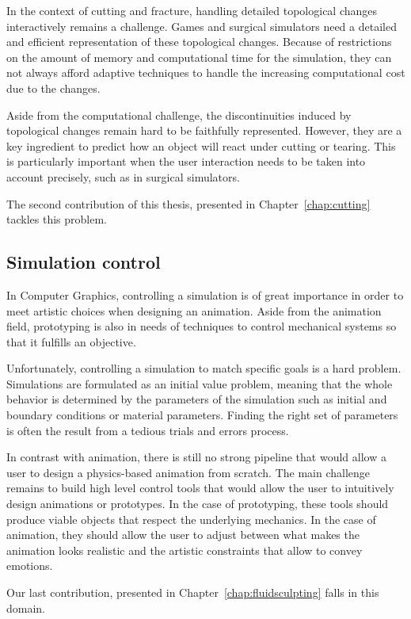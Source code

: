 In the context of cutting and fracture, handling detailed topological changes interactively remains a challenge. Games and surgical simulators need a detailed and efficient representation of these topological changes. Because of restrictions on the amount of memory and computational time for the simulation, they can not always afford adaptive techniques to handle the increasing computational cost due to the changes.

Aside from the computational challenge, the discontinuities induced by topological changes remain hard to be faithfully represented. However, they are a key ingredient to predict how an object will react under cutting or tearing.
This is particularly important when the user interaction needs to be taken into account precisely, such as in surgical simulators.

The second contribution of this thesis, presented in Chapter~\ref{chap:cutting} tackles this problem.

\subsection{Simulation control}

In Computer Graphics, controlling a simulation is of great importance in order to meet artistic choices when designing an animation. Aside from the animation field, prototyping is also in needs of techniques to control mechanical systems so that it fulfills an objective.

Unfortunately, controlling a simulation to match specific goals is a hard problem. 
Simulations are formulated as an initial value problem, meaning that the whole behavior is determined by the parameters of the simulation such as initial and boundary conditions or material parameters. 
Finding the right set of parameters is often the result from a tedious trials and errors process.

In contrast with animation, there is still no strong pipeline that would allow a user to design a physics-based animation from scratch. 
The main challenge remains to build high level control tools that would allow the user to intuitively design animations or prototypes. 
In the case of prototyping, these tools should produce viable objects that respect the underlying mechanics. 
In the case of animation, they should allow the user to adjust between what makes the animation looks realistic and the artistic constraints that allow to convey emotions.

Our last contribution, presented in Chapter~\ref{chap:fluidsculpting} falls in this domain.

